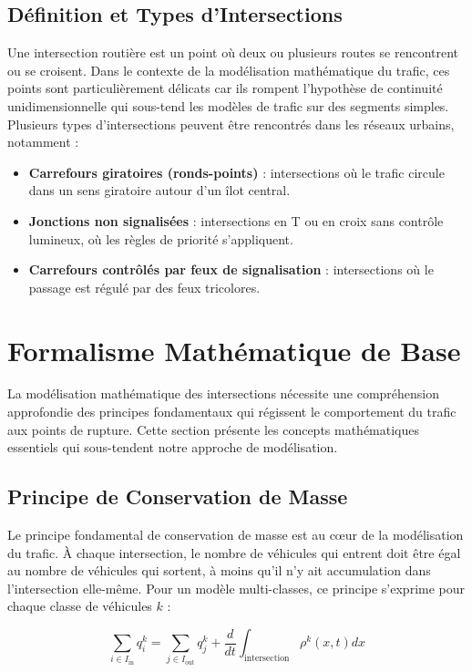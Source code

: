 \subsection{Définition et Types d'Intersections}
Une intersection routière est un point où deux ou plusieurs routes se rencontrent ou se croisent. Dans le contexte de la modélisation mathématique du trafic, ces points sont particulièrement délicats car ils rompent l'hypothèse de continuité unidimensionnelle qui sous-tend les modèles de trafic sur des segments simples. Plusieurs types d'intersections peuvent être rencontrés dans les réseaux urbains, notamment :

\begin{itemize}
    \item \textbf{Carrefours giratoires (ronds-points)} : intersections où le trafic circule dans un sens giratoire autour d'un îlot central.
    \item \textbf{Jonctions non signalisées} : intersections en T ou en croix sans contrôle lumineux, où les règles de priorité s'appliquent.
    \item \textbf{Carrefours contrôlés par feux de signalisation} : intersections où le passage est régulé par des feux tricolores.
\end{itemize}

\section{Formalisme Mathématique de Base}
La modélisation mathématique des intersections nécessite une compréhension approfondie des principes fondamentaux qui régissent le comportement du trafic aux points de rupture. Cette section présente les concepts mathématiques essentiels qui sous-tendent notre approche de modélisation.

\subsection{Principe de Conservation de Masse}
Le principe fondamental de conservation de masse est au cœur de la modélisation du trafic. À chaque intersection, le nombre de véhicules qui entrent doit être égal au nombre de véhicules qui sortent, à moins qu'il n'y ait accumulation dans l'intersection elle-même. Pour un modèle multi-classes, ce principe s'exprime pour chaque classe de véhicules $ k $ :

\[
\sum_{i \in I_{\text{in}}} q_i^k = \sum_{j \in I_{\text{out}}} q_j^k + \frac{d}{dt} \int_{\text{intersection}} \rho^k(x,t) dx
\]

